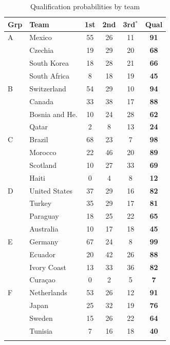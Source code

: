 \documentclass[11pt,letterpaper]{article}
\begin{document}
\begin{table}[!t]
  \centering
  \caption{Qualification probabilities by team}\label{tab:qual}
  \begin{threeparttable}
    {\footnotesize
\begin{minipage}{0.49\textwidth}\centering
\begin{tabular}{llcccc}
\toprule
Grp & Team & 1st & 2nd & 3rd$^{*}$ & Qual \\
\midrule
A & Mexico & 55 & 26 & 11 & \textbf{91} \\
 & Czechia & 19 & 29 & 20 & \textbf{68} \\
 & South Korea & 18 & 28 & 21 & \textbf{66} \\
 & South Africa & 8 & 18 & 19 & \textbf{45} \\
\addlinespace
B & Switzerland & 54 & 29 & 10 & \textbf{94} \\
 & Canada & 33 & 38 & 17 & \textbf{88} \\
 & Bosnia and He. & 10 & 24 & 28 & \textbf{62} \\
 & Qatar & 2 & 8 & 13 & \textbf{24} \\
\addlinespace
C & Brazil & 68 & 23 & 7 & \textbf{98} \\
 & Morocco & 22 & 46 & 20 & \textbf{89} \\
 & Scotland & 10 & 27 & 33 & \textbf{69} \\
 & Haiti & 0 & 4 & 8 & \textbf{12} \\
\addlinespace
D & United States & 37 & 29 & 16 & \textbf{82} \\
 & Turkey & 35 & 29 & 17 & \textbf{81} \\
 & Paraguay & 18 & 25 & 22 & \textbf{65} \\
 & Australia & 10 & 17 & 18 & \textbf{45} \\
\addlinespace
E & Germany & 67 & 24 & 8 & \textbf{99} \\
 & Ecuador & 20 & 42 & 26 & \textbf{88} \\
 & Ivory Coast & 13 & 33 & 36 & \textbf{82} \\
 & Curaçao & 0 & 2 & 5 & \textbf{7} \\
\addlinespace
F & Netherlands & 53 & 26 & 12 & \textbf{91} \\
 & Japan & 25 & 32 & 19 & \textbf{76} \\
 & Sweden & 15 & 26 & 22 & \textbf{64} \\
 & Tunisia & 7 & 16 & 18 & \textbf{40} \\
\addlinespace
\bottomrule
\end{tabular}

\end{minipage}}
\end{threeparttable}
\end{table}
\end{document}
